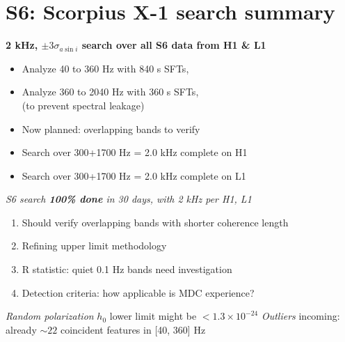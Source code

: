 \section{S6: Scorpius X-1 search summary}

\textbf{2 kHz, $\pm 3 \sigma_{a \sin i}$ search over all S6 data from H1 \& L1}
\begin{itemize}
\item Analyze 40 to 360 Hz with 840 s SFTs,
\item Analyze 360 to 2040 Hz with 360 s SFTs,\\
(to prevent spectral leakage)
\item Now planned: overlapping bands to verify
\item Search over 300+1700 Hz = 2.0 kHz complete on H1
\item Search over 300+1700 Hz = 2.0 kHz complete on L1
\end{itemize}


\emph{S6 search \textbf{100\% done} in 30 days, with 2 kHz per H1, L1}

\begin{enumerate}
\item Should verify overlapping bands with shorter coherence length
\item Refining upper limit methodology
\item R statistic: quiet 0.1 Hz bands need investigation
\item Detection criteria: how applicable is MDC experience?
\end{enumerate}

\emph{Random polarization} $h_0$ lower limit might be $< 1.3\times10^{-24}$
\emph{Outliers} incoming: already $\sim 22$ coincident features in [40, 360] Hz







